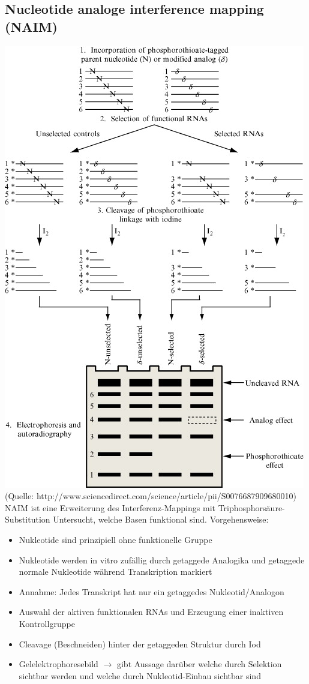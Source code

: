 \subsection{Nucleotide analoge interference mapping (NAIM)}
\includegraphics[scale=0.7]{lectures/160527/pix/NAIM.jpg} \\
(Quelle: http://www.sciencedirect.com/science/article/pii/S0076687909680010) \\
 
NAIM ist eine Erweiterung des Interferenz-Mappings mit Triphosphorsäure-Substitution
Untersucht, welche Basen funktional sind. Vorgehensweise:
\begin{itemize}
\item Nukleotide sind prinzipiell ohne funktionelle Gruppe
\item Nukleotide werden in vitro zufällig durch getaggede Analogika und getaggede normale Nukleotide während Transkription markiert
\item Annahme: Jedes Transkript hat nur ein getaggedes Nukleotid/Analogon
\item Auswahl der aktiven funktionalen RNAs und Erzeugung einer inaktiven Kontrollgruppe
\item Cleavage (Beschneiden) hinter der getaggeden Struktur durch Iod
\item Gelelektrophoresebild $\rightarrow$ gibt Aussage darüber welche durch Selektion sichtbar werden und welche durch Nukleotid-Einbau sichtbar sind
\end{itemize}

